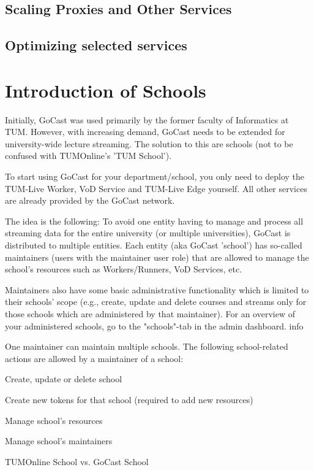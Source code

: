 \subsection{Scaling Proxies and Other Services}

\subsection{Optimizing selected services}

\section{Introduction of Schools}

Initially, GoCast was used primarily by the former faculty of Informatics at TUM. However, with increasing demand, GoCast needs to be extended for university-wide lecture streaming. The solution to this are schools (not to be confused with TUMOnline's 'TUM School').

To start using GoCast for your department/school, you only need to deploy the TUM-Live Worker, VoD Service and TUM-Live Edge yourself. All other services are already provided by the GoCast network.

The idea is the following: To avoid one entity having to manage and process all streaming data for the entire university (or multiple universities), GoCast is distributed to multiple entities. Each entity (aka GoCast 'school') has so-called maintainers (users with the maintainer user role) that are allowed to manage the school's resources such as Workers/Runners, VoD Services, etc.

Maintainers also have some basic administrative functionality which is limited to their schools' scope (e.g., create, update and delete courses and streams only for those schools which are administered by that maintainer). For an overview of your administered schools, go to the "schools"-tab in the admin dashboard.
info

One maintainer can maintain multiple schools.
The following school-related actions are allowed by a maintainer of a school:

    Create, update or delete school

    Create new tokens for that school (required to add new resources)

    Manage school's resources

    Manage school's maintainers

TUMOnline School vs. GoCast School

